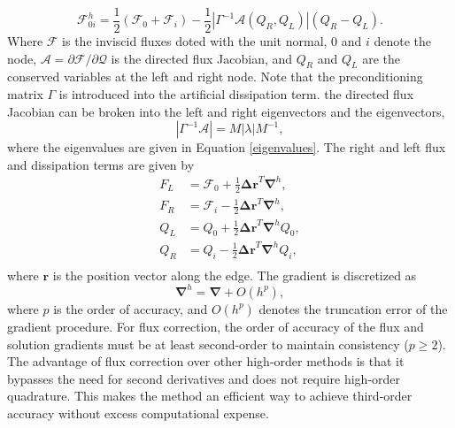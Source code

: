 \documentclass[draft]{aiaa-pretty}
\begin{document}
\begin{equation}
 \mathcal{F}^h_{0i}=\frac{1}{2}\left(\mathcal{F}_0+\mathcal{F}_i\right)-\frac{1}{2}\left|\Gamma^{-1}\mathcal{A}\left(Q_R,Q_L\right)\right|\left(Q_R-Q_L\right).
\end{equation}
Where $\mathcal{F}$ is the inviscid fluxes doted with the unit normal, $0$ and $i$ denote the node, $\mathcal{A}=\partial\mathcal{F}/\partial\mathcal{Q}$ is the directed flux 
Jacobian, and $Q_R$ and $Q_L$ are the conserved variables at the left and right node.  Note that the preconditioning matrix $\Gamma$ is introduced into the artificial dissipation term.
the directed flux Jacobian can be broken into the left and right eigenvectors and the eigenvectors,
\begin{equation}
 \left|\Gamma^{-1}\mathcal{A}\right| = M\left|\lambda\right|M^{-1},
\end{equation}
where the eigenvalues are  given in Equation \ref{eigenvalues}.  The right and left flux and dissipation terms are given by
\begin{equation}
 \begin{aligned}
  F_L &= \mathcal{F}_0 + \frac{1}{2} \mathbf{\Delta r}^T \mathbf{\nabla}^h, \\
  F_R &= \mathcal{F}_i  - \frac{1}{2} \mathbf{\Delta r}^T \mathbf{\nabla}^h, \\
  Q_L &= Q_0 + \frac{1}{2} \mathbf{\Delta r}^T \mathbf{\nabla}^h Q_0,\\
  Q_R &= Q_i - \frac{1}{2} \mathbf{\Delta r}^T \mathbf{\nabla}^h Q_i,\\
 \end{aligned}
\end{equation}
where $\mathbf{r}$ is the position vector along the edge.  The gradient is discretized as 
\begin{equation}
\mathbf{\nabla}^h = \mathbf{\nabla} + O(h^p)
\label{Gradient},
\end{equation}
where $p$ is the order of accuracy, and $O(h^p)$ denotes the truncation error of the gradient procedure.  For flux correction, the order of accuracy of the flux and solution gradients 
must be at least second-order to maintain consistency ($p\ge2$).  The advantage of flux correction over other high-order methods is that it bypasses the  need for second derivatives and
does not require high-order quadrature.  This makes the method an efficient way to achieve third-order accuracy without excess computational expense.
\end{document}
